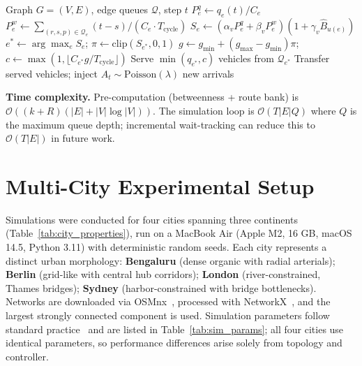 \documentclass[letterpaper, conference]{IEEEtran}
\begin{document}
\begin{algorithm}[t]
\caption{WTM Controller: Per-Step Decision}
\label{alg:wtm}
\begin{algorithmic}[1]
\Require Graph $G=(V,E)$, edge queues $\mathcal{Q}$, step $t$
    \State $P_e^q \gets q_e(t)/C_e$ 
    \State $P_e^w \gets \sum_{(r,s,p)\in\mathcal{Q}_e}(t-s)/(C_e\cdot T_{\mathrm{cycle}})$ 
    \State $S_e \gets (\alpha_v P_e^q+\beta_v P_e^w)(1+\gamma_v\hat{B}_{u(e)})$ 
  \EndFor
  \State $e^*\gets\arg\max_{e}S_e$; \quad $\pi\gets\mathrm{clip}(S_{e^*},0,1)$ \Comment{\eqref{eq:winner},\eqref{eq:priority_clip}}
  \State $g\gets g_{\min}+(g_{\max}-g_{\min})\pi$; \quad $c\gets\max(1,\lfloor C_{e^*}g/T_{\mathrm{cycle}}\rfloor)$ \Comment{\eqref{eq:green_time},\eqref{eq:discharge}}
  \State Serve $\min(q_{e^*},c)$ vehicles from $\mathcal{Q}_{e^*}$
\EndFor
\State Transfer served vehicles; inject $A_t\sim\mathrm{Poisson}(\lambda)$ new arrivals
\end{algorithmic}
\end{algorithm}

\textbf{Time complexity.} Pre-computation (betweenness + route bank) is $\mathcal{O}((k+R)(|E|+|V|\log|V|))$. The simulation loop is $\mathcal{O}(T|E|Q)$ where $Q$ is the maximum queue depth; incremental wait-tracking can reduce this to $\mathcal{O}(T|E|)$ in future work.

\section{Multi-City Experimental Setup}
\label{section_exp_setup}
Simulations were conducted for four cities spanning three continents (Table~\ref{tab:city_properties}), run on a MacBook Air (Apple M2, 16 GB, macOS 14.5, Python 3.11) with deterministic random seeds. Each city represents a distinct urban morphology: \textbf{Bengaluru} (dense organic with radial arterials); \textbf{Berlin} (grid-like with central hub corridors); \textbf{London} (river-constrained, Thames bridges); \textbf{Sydney} (harbor-constrained with bridge bottlenecks). Networks are downloaded via OSMnx~\cite{boeing2017osmnx}, processed with NetworkX~\cite{hagberg2008networkx}, and the largest strongly connected component is used. Simulation parameters follow standard practice~\cite{hcm2016} and are listed in Table~\ref{tab:sim_params}; all four cities use identical parameters, so performance differences arise solely from topology and controller.
\end{document}
